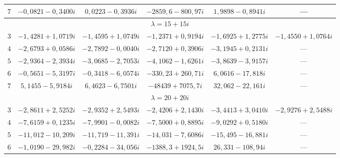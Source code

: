 \begin{table}[b!]
\begin{minipage}[t]{135mm}
\begin{tabular}{c|c|c|c|c|c}
      \hline

      $7$&$-0{,}0821-0{,}3400i$&$0{,}0223-0{,}3936i$&$-2859{,}6-800{,}97i$&$1{,}9898-0{,}8941i$&---\\

      \hline

      \multicolumn{6}{c}{$\lambda=15+15i$}\\

      \hline

      $3$&$-1{,}4281+1{,}0719i$&$-1{,}4595+1{,}0749i$&$-1{,}2371+0{,}9194i$&$-1{,}6925+1{,}2775i$&$-1{,}4550+1{,}0764i$\\

      \hline

      $4$&$-2{,}6793+0{,}0586i$&$-2{,}7892-0{,}0040i$&$-2{,}7120+0{,}3906i$&$-3{,}1945+0{,}2131i$&---\\

      \hline

      $5$&$-2{,}9364-2{,}3934i$&$-3{,}0685-2{,}7053i$&$-4{,}1062-1{,}6261i$&$-3{,}8639-3{,}9157i$&---\\

      \hline

      $6$&$-0{,}5651-5{,}3197i$&$-0{,}3418-6{,}0574i$&$-330{,}23+260{,}71i$&$6{,}0616-17{,}818i$&---\\

      \hline

      $7$&$5{,}1455-5{,}9184i$&$6{,}4623-6{,}7501i$&$-48439+7075{,}7i$&$32{,}062-22{,}161i$&---\\

      \hline

      \multicolumn{6}{c}{$\lambda=20+20i$}\\

      \hline

      $3$&$-2{,}8611+2{,}5252i$&$-2{,}9352+2{,}5493i$&$-2{,}4206+2{,}1430i$&$-3{,}4413+3{,}0410i$&$-2{,}9276+2{,}5488i$\\

      \hline

      $4$&$-7{,}6159+0{,}1235i$&$-7{,}9901-0{,}0082i$&$-7{,}5000+0{,}8895i$&$-9{,}0292+0{,}5180i$&---\\

      \hline

      $5$&$-11{,}012-10{,}209i$&$-11{,}719-11{,}391i$&$-14{,}031-7{,}6086i$&$-15{,}495-16{,}881i$&---\\

      \hline

      $6$&$-1{,}0190-29{,}982i$&$-0{,}2284-34{,}056i$&$-1388{,}3+1924{,}5i$&$26{,}331-108{,}94i$&---\\


\end{tabular}
\end{minipage}
\end{table}
